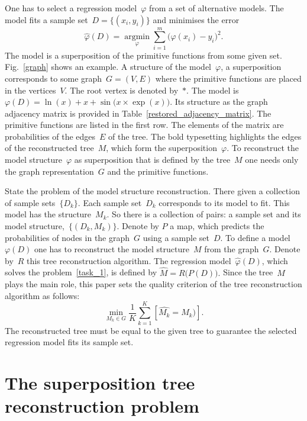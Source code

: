 \documentclass[12pt]{article}
\begin{document}
One has to select a regression model~$\varphi$ from a set of alternative models. The model fits a sample set~$D=\{(x_i,y_i)\}$ and minimises the error
\begin{equation}
\hat{\varphi}(D)=\mathop{\arg\min}\limits_\varphi\sum_{i=1}^m\bigl(\varphi(x_i)-y_i\bigr)^2.
\label{task_1}
\end{equation}
The model is a superposition of the primitive functions from some given set. Fig.~\ref{graph} shows an example.
A structure of the model~$\varphi$, a superposition corresponds to some graph~$G=(V,E)$ where the primitive functions are placed in the vertices~$V$. The {root} vertex is denoted by~$\ast$.  The model is~$\varphi(D) = \ln(x) + x + \sin\bigl(x\times \exp(x)\bigr)$. Its structure as the graph adjacency matrix is provided in Table~\ref{restored_adjacency_matrix}. The primitive functions are listed in the first row. The elements of the matrix are probabilities of the edges~$E$ of the tree. The bold typesetting highlights the edges of the reconstructed tree~$M$, which form the superposition~$\varphi$. To reconstruct the model structure~$\varphi$ as superposition that is defined by the tree~$M$ one needs only the graph representation~$G$ and the primitive functions.


State the problem of the model structure reconstruction. There given a collection of sample sets~$\{D_k\}$. Each sample set~$D_k$ corresponds to its model to fit. This model has the structure~$M_k$. So there is a collection of pairs: a sample set and its model structure,~$\{(D_k, M_k)\}$.
Denote by $P$ a map, which predicts the probabilities of nodes in the graph~$G$ using a sample set~$D$. To define a model~$\varphi(D)$ one has to reconstruct the model structure~$M$ from the graph~$G$. Denote by~$R$ this tree reconstruction algorithm. The regression model~$\hat{\varphi}(D)$, which solves the problem~\eqref{task_1}, is defined by
$
\hat{M}=R\bigl(P(D)\bigr).
$
Since the tree~$M$ plays the main role, this paper sets the quality criterion of the tree reconstruction algorithm as follows:
\[
\min_{M_k \in G} \frac{1}{K}\sum_{k=1}^K [ \hat{M_k} = M_k)].
\]
The reconstructed tree must be equal to the given tree to guarantee the selected regression model fits its sample set.


\section{The superposition tree reconstruction problem}
\end{document}
